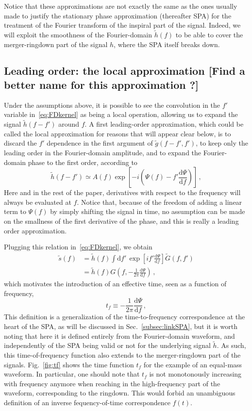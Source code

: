 \documentclass[aps,showpacs,twocolumn,
prd,superscriptaddress,nofootinbib]{revtex4-1}
\newcommand{\be}{\begin{equation}}
\newcommand{\ee}{\end{equation}}
\newcommand\ud{{\mathrm{d}}}
\newcommand{\nn}{\nonumber}
\newcommand{\tf}{t_{f}}
\newcommand{\SM}[1]{{\color{Red} #1}}
\begin{document}
Notice that these approximations are not exactly the same as the ones usually made to justify the stationary phase approximation (thereafter SPA) for the treatment of the Fourier transform of the inspiral part of the signal. Indeed, we will exploit the smoothness of the Fourier-domain $\tilde{h}(f)$ to be able to cover the merger-ringdown part of the signal $h$, where the SPA itself breaks down.


\subsection{Leading order: the local approximation \SM{[Find a better name for this approximation ?]}}
\label{subsec:LLP}

Under the assumptions above, it is possible to see the convolution in the $f'$ variable in~\eqref{eq:FDkernel} as being a local operation, allowing us to expand the signal $\tilde{h}(f-f')$ around $f$. A first leading-order approximation, which could be called the local approximation for reasons that will appear clear below, is to discard the $f'$ dependence in the first argument of $\tilde{g}(f-f', f')$, to keep only the leading order in the Fourier-domain amplitude, and to expand the Fourier-domain phase to the first order, according to
\be
	\tilde{h}(f-f') \simeq A(f) \exp\left[ -i\left( \Psi(f) - f' \frac{\ud \Psi}{\ud f} \right) \right] \,,
\ee
Here and in the rest of the paper, derivatives with respect to the frequency will always be evaluated at $f$. Notice that, because of the freedom of adding a linear term to $\Psi(f)$ by simply shifting the signal in time, no assumption can be made on the smallness of the first derivative of the phase, and this is really a leading order approximation.

Plugging this relation in~\eqref{eq:FDkernel}, we obtain
\begin{align}
	\tilde{s}(f) &= \tilde{h}(f) \int \ud f' \, \exp\left[ i f' \frac{\ud \Psi}{\ud f} \right] \tilde{G}(f,f') \nn\\
	&= \tilde{h}(f) G\left( f, -\frac{1}{2\pi} \frac{\ud \Psi}{\ud f} \right) \,,
\end{align}
which motivates the introduction of an effective time, seen as a function of frequency,
\be\label{eq:deftf}
	\tf \equiv -\frac{1}{2\pi} \frac{\ud \Psi}{\ud f} \,,
\ee
This definition is a generalization of the time-to-frequency correspondence at the heart of the SPA, as will be discussed in Sec.~\ref{subsec:linkSPA}, but it is worth noting that here it is defined entirely from the Fourier-domain waveform, and independently of the SPA being valid or not for the underlying signal $\tilde{h}$. As such, this time-of-frequency function also extends to the merger-ringdown part of the signals. Fig.~\ref{fig:tf} shows the time function $\tf$ for the example of an equal-mass waveform. In particular, one should note that $\tf$ is not monotonously increasing with frequency anymore when reaching in the high-frequency part of the waveform, corresponding to the ringdown. This would forbid an unambiguous definition of an inverse fequency-of-time correspondence $f(t)$. 
\end{document}
